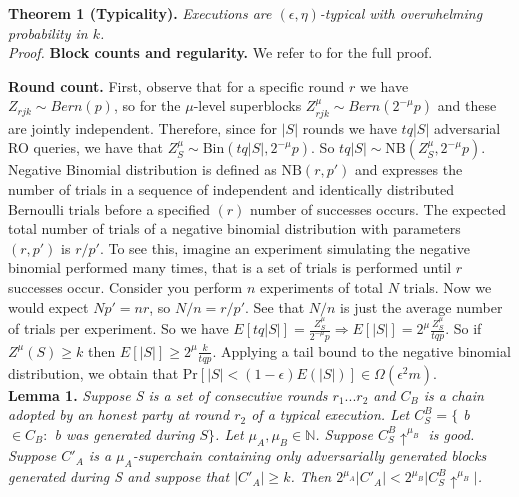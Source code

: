 \textbf{Theorem 1 (Typicality).} \textit{Executions are $(\epsilon, \eta)$-typical 
with overwhelming probability in $k$.}\\

\textit{Proof.} \textbf{Block counts and regularity.} We refer to \cite{Backbone} for
the full proof.

\textbf{Round count.} First, observe that for a specific round $r$ we have $Z_{rjk}
\sim Bern(p)$, so for the $\mu$-level superblocks $Z_{rjk}^\mu \sim Bern(2^{-\mu}p)$
and these are jointly independent. Therefore, since for $\vert S \vert$ rounds we
have $tq\vert S \vert$ adversarial RO queries, we have that $Z_S^\mu \sim
\text{Bin}(tq \vert S \vert, 2^{-\mu}p)$. So $tq \vert S \vert \sim
\text{NB}(Z_S^\mu, 2^{-\mu}p)$. Negative Binomial distribution is defined
as $\text{NB}(r, p')$ and expresses the number of trials in a sequence of
independent and identically distributed Bernoulli trials before a specified
$(r)$ number of successes occurs. The expected total number of trials of a
negative binomial distribution with parameters $(r, p')$ is $r/p'$. To see
this, imagine an experiment simulating the negative binomial performed many
times, that is a set of trials is performed until $r$ successes occur. Consider
you perform $n$ experiments of total $N$ trials. Now we would expect $Np' = nr$,
so $N/n = r/p'$. See that $N/n$ is just the average number of trials per
experiment. So we have $E[tq \vert S \vert] = \frac{Z^\mu_S}{2^{-\mu}p}
\Rightarrow E[\vert S \vert] = 2^\mu \frac{Z^\mu_S}{tqp}$. So if $Z^\mu(S) \geq k$
then $E[\vert S \vert] \geq 2^\mu \frac{k}{tqp}$. Applying a tail bound to the
negative binomial distribution, we obtain that $\text{Pr}[\vert S \vert < (1 -
\epsilon)E(\vert S \vert)] \in \Omega(\epsilon^{2}m)$.  \\

\textbf{Lemma 1.} \textit{Suppose S is a set of consecutive rounds $r_1 ... r_2$
and $C_B$ is a chain adopted by an honest party at round $r_2$ of a typical
execution. Let $C^{B}_{S} = \{$ b $\in C_B:$ b was generated during $S\}$. Let
$\mu_A, \mu_B \in \mathbb{N}$. Suppose $C^{B}_{S}\uparrow^{\mu_B}$ is good.
Suppose $C'_A$ is a $\mu_A$-superchain containing only adversarially generated
blocks generated during S and suppose that $\vert C'_A \vert \geq k$. Then
$2^{\mu_A} \vert C'_A \vert <  2^{\mu_B} \vert    C^{B}_{S}\uparrow^{\mu_B}\vert $. }\\

